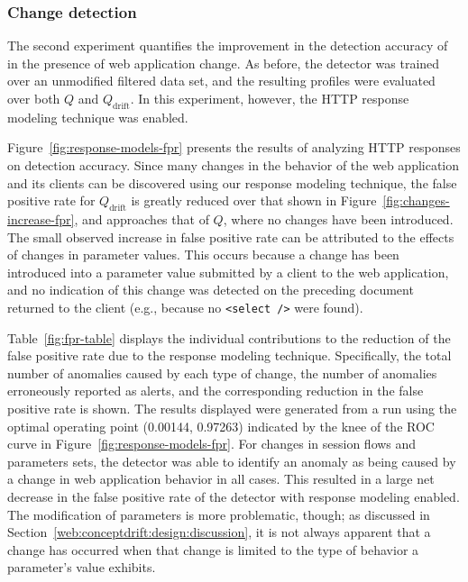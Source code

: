 \subsubsection{Change detection}
\label{web:conceptdrift:eval:detection}
The second experiment quantifies the improvement in the detection accuracy of \webanomaly in the presence of web application change.  As before, the detector was trained over an unmodified filtered data set, and the resulting profiles were evaluated over both $Q$ and $Q_{\text{drift}}$.  In this experiment, however, the \ac{HTTP} response modeling technique was enabled.

Figure~\ref{fig:response-models-fpr} presents the results of analyzing \ac{HTTP} responses on detection accuracy.  Since many changes in the behavior of the web application and its clients can be discovered using our response modeling technique, the false positive rate for $Q_{\text{drift}}$ is greatly reduced over that shown in Figure~\ref{fig:changes-increase-fpr}, and approaches that of $Q$, where no changes have been introduced.  The small observed increase in false positive rate can be attributed to the effects of changes in parameter values.  This occurs because a change has been introduced into a parameter value submitted by a client to the web application, and no indication of this change was detected on the preceding document returned to the client (e.g., because no \texttt{<select />} were found).

Table~\ref{fig:fpr-table} displays the individual contributions to the reduction of the false positive rate due to the response modeling technique.  Specifically, the total number of anomalies caused by each type of change, the number of anomalies erroneously reported as alerts, and the corresponding reduction in the false positive rate is shown.  The results displayed were generated from a run using the optimal operating point (0.00144, 0.97263) indicated by the knee of the \ac{ROC} curve in Figure~\ref{fig:response-models-fpr}.  For changes in session flows and parameters sets, the detector was able to identify an anomaly as being caused by a change in web application behavior in all cases.  This resulted in a large net decrease in the false positive rate of the detector with response modeling enabled.  The modification of parameters is more problematic, though; as discussed in Section~\ref{web:conceptdrift:design:discussion}, it is not always apparent that a change has occurred when that change is limited to the type of behavior a parameter's value exhibits.

